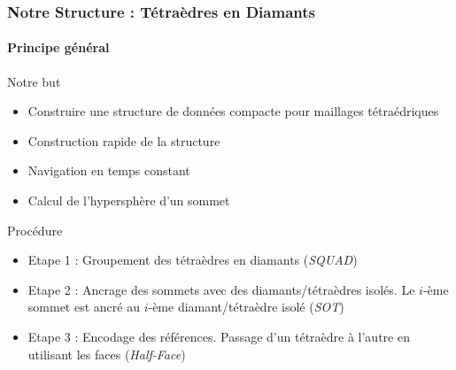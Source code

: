 \documentclass[9pt]{beamer}
\begin{document}
\begin{frame}
\small
\frametitle{Notre Structure : Tétraèdres en Diamants}
\framesubtitle{Principe général}
\small
\begin{block}{Notre but}
\begin{itemize}
\item Construire une structure de données compacte pour maillages tétraédriques
\item Construction rapide de la structure
\item Navigation en temps constant
\item Calcul de l'hypersphère d'un sommet
\end{itemize}
\end{block}
\begin{block}{Procédure}
\begin{itemize}
\item Etape 1 : Groupement des tétraèdres en diamants (\textit{SQUAD})
\item Etape 2 : Ancrage des sommets avec des diamants/tétraèdres isolés. Le $i$-ème sommet est ancré au $i$-ème diamant/tétraèdre isolé (\textit{SOT})
\item Etape 3 : Encodage des références. Passage d'un tétraèdre à l'autre en utilisant les faces (\textit{Half-Face})
\end{itemize}
\end{block}
\end{frame}
\end{document}
